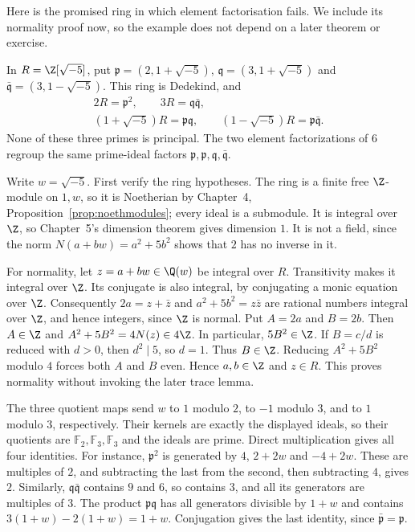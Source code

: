 Here is the promised ring in which element factorisation fails. We include its normality proof now, so the example does not depend on a later theorem or exercise.

\begin{example}\label{ex:sixtwice}
In $R=\Z[\sqrt{-5}]$, put $\mathfrak p=(2,1+\sqrt{-5})$, $\mathfrak q=(3,1+\sqrt{-5})$ and $\bar{\mathfrak q}=(3,1-\sqrt{-5})$. This ring is Dedekind, and
\[
\begin{gathered}
 2R=\mathfrak p^2,\qquad 3R=\mathfrak q\bar{\mathfrak q},\\
 (1+\sqrt{-5})R=\mathfrak p\mathfrak q,\qquad
 (1-\sqrt{-5})R=\mathfrak p\bar{\mathfrak q}.
\end{gathered}
\]
None of these three primes is principal. The two element factorizations of $6$ regroup the same prime-ideal factors $\mathfrak p,\mathfrak p,\mathfrak q,\bar{\mathfrak q}$.
\end{example}

Write $w=\sqrt{-5}$. First verify the ring hypotheses. The ring is a finite free $\Z$-module on $1,w$, so it is Noetherian by Chapter~4, Proposition~\ref{prop:noethmodules}; every ideal is a submodule. It is integral over $\Z$, so Chapter~5's dimension theorem gives dimension $1$. It is not a field, since the norm $N(a+bw)=a^2+5b^2$ shows that $2$ has no inverse in it.

For normality, let $z=a+bw\in\Q(w)$ be integral over $R$. Transitivity makes it integral over $\Z$. Its conjugate is also integral, by conjugating a monic equation over $\Z$. Consequently $2a=z+\bar z$ and $a^2+5b^2=z\bar z$ are rational numbers integral over $\Z$, and hence integers, since $\Z$ is normal. Put $A=2a$ and $B=2b$. Then $A\in\Z$ and $A^2+5B^2=4N(z)\in4\Z$. In particular, $5B^2\in\Z$. If $B=c/d$ is reduced with $d>0$, then $d^2\mid5$, so $d=1$. Thus $B\in\Z$. Reducing $A^2+5B^2$ modulo $4$ forces both $A$ and $B$ even. Hence $a,b\in\Z$ and $z\in R$. This proves normality without invoking the later trace lemma.

The three quotient maps send $w$ to $1$ modulo $2$, to $-1$ modulo $3$, and to $1$ modulo $3$, respectively. Their kernels are exactly the displayed ideals, so their quotients are $\mathbb F_2,\mathbb F_3,\mathbb F_3$ and the ideals are prime. Direct multiplication gives all four identities. For instance, $\mathfrak p^2$ is generated by $4$, $2+2w$ and $-4+2w$. These are multiples of $2$, and subtracting the last from the second, then subtracting $4$, gives $2$. Similarly, $\mathfrak q\bar{\mathfrak q}$ contains $9$ and $6$, so contains $3$, and all its generators are multiples of $3$. The product $\mathfrak p\mathfrak q$ has all generators divisible by $1+w$ and contains $3(1+w)-2(1+w)=1+w$. Conjugation gives the last identity, since $\bar{\mathfrak p}=\mathfrak p$.

